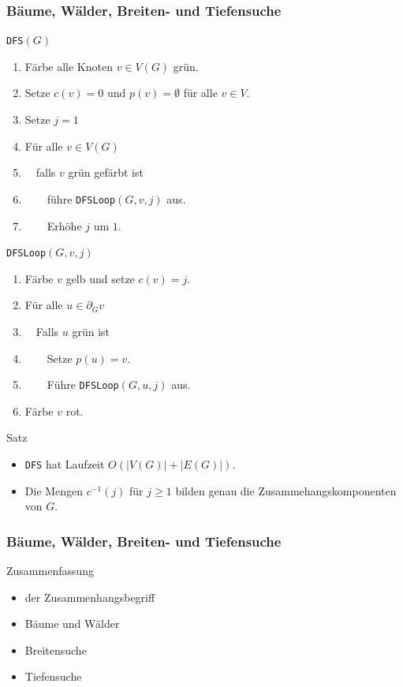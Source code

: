 \documentclass[aspectratio=1610, 11pt]{beamer}
\newcommand{\mytitle}{B\"aume, W\"alder, Breiten- und Tiefensuche}
\begin{document}
\begin{frame}\frametitle{\mytitle}
	\begin{overprint}
		\begin{exampleblock}{{\tt DFS}$(G)$}
			\begin{enumerate}
				\item F\"arbe alle Knoten $v\in V(G)$ gr\"un.
				\item Setze $c(v)=0$ und $p(v)=\emptyset$ f\"ur alle $v\in V$.
				\item Setze $j=1$
				\item F\"ur alle $v\in V(G)$
				\item $\quad$falls $v$ gr\"un gef\"arbt ist
				\item $\quad\quad$f\"uhre {\tt DFSLoop}$(G,v,j)$ aus.
				\item $\quad\quad$Erh\"ohe $j$ um $1$.
			\end{enumerate}
		\end{exampleblock}
		\begin{exampleblock}{{\tt DFSLoop}$(G,v,j)$}
			\begin{enumerate}
				\item F\"arbe $v$ gelb und setze $c(v)=j$.
				\item F\"ur alle $u\in\partial_Gv$
				\item $\quad$Falls $u$ gr\"un ist
				\item $\quad\quad$Setze $p(u)=v$.
				\item $\quad\quad$F\"uhre {\tt DFSLoop}$(G,u,j)$ aus.
				\item F\"arbe $v$ rot.
			\end{enumerate}
		\end{exampleblock}
		\begin{block}{Satz}
			\begin{itemize}
				\item {\tt DFS} hat Laufzeit $O(|V(G)|+|E(G)|)$.
				\item Die Mengen $c^{-1}(j)$ f\"ur $j\geq1$ bilden genau die Zusammehangskomponenten von $G$.
			\end{itemize}
		\end{block}
	\end{overprint}
\end{frame}

\begin{frame}\frametitle{\mytitle}
	\begin{exampleblock}{Zusammenfassung}
		\begin{itemize}
			\item der Zusammenhangsbegriff
			\item B\"aume und W\"alder
			\item Breitensuche
			\item Tiefensuche
		\end{itemize}
	\end{exampleblock}
\end{frame}
\end{document}
